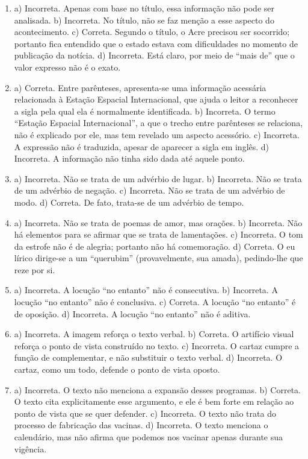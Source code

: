 \begin{enumerate}
\item
a) Incorreta. Apenas com base no título, essa informação não pode ser analisada.
b) Incorreta. No título, não se faz menção a esse aspecto do acontecimento.
c) Correta. Segundo o título, o Acre precisou ser socorrido; portanto fica entendido que o estado estava com dificuldades no momento de publicação da notícia.
d) Incorreta. Está claro, por meio de “mais de” que o valor expresso não é o exato.

\item
a) Correta. Entre parênteses, apresenta-se uma informação acessária relacionada à Estação Espacial Internacional, que ajuda o leitor a reconhecer a sigla pela qual ela é normalmente identificada.
b) Incorreta. O termo “Estação Espacial Internacional”, a que o trecho entre parênteses se relaciona, não é explicado por ele, mas tem revelado um aspecto acessório.
c) Incorreta. A expressão não é traduzida, apesar de aparecer a sigla em inglês.
d) Incorreta. A informação não tinha sido dada até aquele ponto.

\item
a) Incorreta. Não se trata de um advérbio de lugar.
b) Incorreta. Não se trata de um advérbio de negação.
c) Incorreta. Não se trata de um advérbio de modo.
d) Correta. De fato, trata-se de um advérbio de tempo.

\item
a) Incorreta. Não se trata de poemas de amor, mas orações.
b) Incorreta. Não há elementos para se afirmar que se trata de lamentações.
c) Incorreta. O tom da estrofe não é de alegria; portanto não há comemoração.
d) Correta. O eu lírico dirige-se a um “querubim” (provavelmente, sua amada), pedindo-lhe que reze por si.

\item
a) Incorreta. A locução “no entanto” não é consecutiva.
b) Incorreta. A locução “no entanto” não é conclusiva.
c) Correta. A locução “no entanto” é de oposição.
d) Incorreta. A locução “no entanto” não é aditiva.

\item
a) Incorreta. A imagem reforça o texto verbal.
b) Correta. O artifício visual reforça o ponto de vista construído no texto.
c) Incorreta. O cartaz cumpre a função de complementar, e não substituir o texto verbal.
d) Incorreta. O cartaz, como um todo, defende o ponto de vista oposto.

\item
a) Incorreta. O texto não menciona a expansão desses programas.
b) Correta. O texto cita explicitamente esse argumento, e ele é bem forte em relação ao ponto de vista que se quer defender.
c) Incorreta. O texto não trata do processo de fabricação das vacinas.
d) Incorreta. O texto menciona o calendário, mas não afirma que podemos nos vacinar apenas durante sua vigência.


\end{enumerate}
